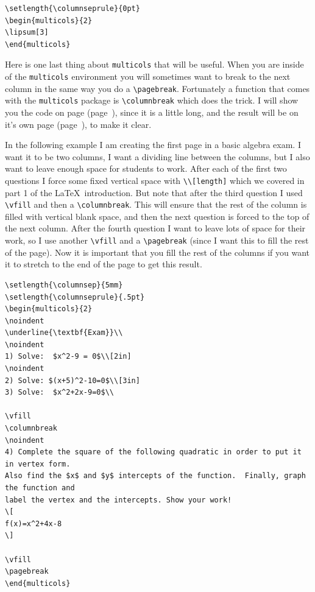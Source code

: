 \documentclass{article}
\begin{document}
\begin{verbatim}
\setlength{\columnseprule}{0pt}
\begin{multicols}{2}
\lipsum[3]
\end{multicols}
\end{verbatim}

\setlength{\columnseprule}{0pt}
\begin{multicols}{2}
\lipsum[3]
\end{multicols}

Here is one last thing about \verb|multicols| that will be useful.  When you are inside of the \verb|multicols| environment you will sometimes want to break to the next column in the same way you do a \verb|\pagebreak|.  Fortunately a function that comes with the \verb|multicols| package is \verb|\columnbreak| which does the trick.  I will show you the code on page (page~\pageref{multicolcode}), since it is a little long, and the result will be on it's own page (page~\pageref{multicolexample}), to make it clear. 

In the following example I am creating the first page in a basic algebra exam.  I want it to be two columns, I want a dividing line between the columns, but I also want to leave enough space for students to work.  After each of the first two questions I force some fixed vertical space with \verb|\\[length]| which we covered in part 1 of the \LaTeX\ introduction.  But note that after the third question I used \verb|\vfill| and then a \verb|\columnbreak|.  This will ensure that the rest of the column is filled with vertical blank space, and then the next question is forced to the top of the next column.  After the fourth question I want to leave lots of space for their work, so I use another \verb|\vfill| and a \verb|\pagebreak| (since I want this to fill the rest of the page).  Now it is important that you fill the rest of the columns if you want it to stretch to the end of the page to get this result.

\newpage
{}\label{multicolcode}

\begin{verbatim}
\setlength{\columnsep}{5mm}
\setlength{\columnseprule}{.5pt}
\begin{multicols}{2}
\noindent
\underline{\textbf{Exam}}\\
\noindent
1) Solve:  $x^2-9 = 0$\\[2in]
\noindent
2) Solve: $(x+5)^2-10=0$\\[3in]
3) Solve:  $x^2+2x-9=0$\\

\vfill
\columnbreak
\noindent
4) Complete the square of the following quadratic in order to put it in vertex form.  
Also find the $x$ and $y$ intercepts of the function.  Finally, graph the function and 
label the vertex and the intercepts. Show your work!
\[
f(x)=x^2+4x-8
\]

\vfill
\pagebreak
\end{multicols}
\end{verbatim}
\newpage
{}\label{multicolexample}
\end{document}
